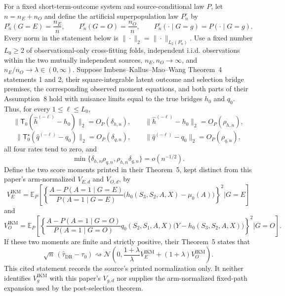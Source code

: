 For a fixed short-term-outcome system and source-conditional law \(P\), let \(n=n_E+n_O\) and define the artificial superpopulation law \(P_n^{\circ}\) by
\[
 P_n^{\circ}(G=E)=\frac{n_E}{n},
 \qquad
 P_n^{\circ}(G=O)=\frac{n_O}{n},
 \qquad
 P_n^{\circ}(\cdot\mid G=g)=P(\cdot\mid G=g).
\]
Every norm in the statement below is \(\|\cdot\|_2=\|\cdot\|_{L_2(P_n^{\circ})}\).  Use a fixed number \(L_0\ge2\) of observational-only cross-fitting folds, independent i.i.d. observations within the two mutually independent sources, \(n_E,n_O\to\infty\), and \(n_E/n_O\to\lambda\in(0,\infty)\).  Suppose Imbens--Kallus--Mao--Wang Theorem~4 statements 1 and 2, their square-integrable latent outcome and selection bridge premises, the corresponding observed moment equations, and both parts of their Assumption~8 hold with nuisance limits equal to the true bridges \(h_0\) and \(q_0\).  Thus, for every \(1\le\ell\le L_0\),
\[
 \|\mathsf T_0(\widehat h^{(-\ell)}-h_0)\|_2=O_P(\delta_{h,n}),
 \qquad
 \|\widehat h^{(-\ell)}-h_0\|_2=O_P(\rho_{h,n}),
\]
\[
 \|\mathsf T_0^\star(\widehat q^{(-\ell)}-q_0)\|_2=O_P(\delta_{q,n}),
 \qquad
 \|\widehat q^{(-\ell)}-q_0\|_2=O_P(\rho_{q,n}),
\]
all four rates tend to zero, and
\[
 \min\{\delta_{h,n}\rho_{q,n},\rho_{h,n}\delta_{q,n}\}
 =o(n^{-1/2}).
\]
Define the two score moments printed in their Theorem~5, kept distinct from this paper's arm-normalized \(V_{E,d}\) and \(V_{O,d}\), by
\[
 V_E^{\mathrm{IKM}}
 =\mathbb E_P\!\left[
 \left\{\frac{A-P(A=1\mid G=E)}{P(A=1\mid G=E)}
 \bigl(h_0(S_3,S_2,A,X)-\mu_0(A)\bigr)\right\}^2
 \mathrel{\Big|}G=E\right]
\]
and
\[
 V_O^{\mathrm{IKM}}
 =\mathbb E_P\!\left[
 \left\{\frac{A-P(A=1\mid G=O)}{P(A=1\mid G=O)}
 q_0(S_2,S_1,A,X)
 \bigl(Y-h_0(S_3,S_2,A,X)\bigr)\right\}^2
 \mathrel{\Big|}G=O\right].
\]
If these two moments are finite and strictly positive, their Theorem~5 states that
\[
 \sqrt n\,(\widehat\tau_{\mathrm{DR}}-\tau_0)
 \rightsquigarrow
 \mathcal N\!\left(0,
 \frac{1+\lambda}{\lambda}V_E^{\mathrm{IKM}}
 +(1+\lambda)V_O^{\mathrm{IKM}}\right).
\]
This cited statement records the source's printed normalization only.  It neither identifies \(V_g^{\mathrm{IKM}}\) with this paper's \(V_{g,d}\) nor supplies the arm-normalized fixed-path expansion used by the post-selection theorem.
